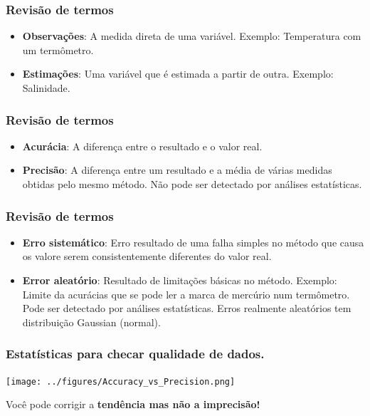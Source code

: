 \begin{frame}
\frametitle{Revisão de termos}
\begin{itemize}
    \item {\bf Observações}: A medida direta de uma variável. Exemplo: Temperatura
          com um termômetro.
    \vspace{1.5cm}\pause
    \item {\bf Estimações}: Uma variável que é estimada a partir de outra.  Exemplo:
          Salinidade.
\end{itemize}
\end{frame}

\begin{frame}
\frametitle{Revisão de termos}
\begin{itemize}
    \item {\bf Acurácia}: A diferença entre o resultado e o valor real.
    \vspace{1.4cm}\pause
    \item {\bf Precisão}: A diferença entre um resultado e a média de várias medidas
          obtidas pelo mesmo método. Não pode ser detectado por análises
          estatísticas.
\end{itemize}
\end{frame}

\begin{frame}
\frametitle{Revisão de termos}
\begin{itemize}
    \item {\bf Erro sistemático}: Erro resultado de uma falha simples no método que
          causa os valore serem consistentemente diferentes do valor real.
    \vspace{0.7cm}\pause
    \item {\bf Error aleatório}: Resultado de limitações básicas no método. Exemplo:
          Limite da acurácias que se pode ler a marca de mercúrio num
          termômetro.  Pode ser detectado por análises estatísticas.
          Erros realmente aleatórios tem distribuição Gaussian (normal).
\end{itemize}
\end{frame}

\begin{frame}
\frametitle{Estatísticas para checar qualidade de dados.}
    \begin{center}
        \texttt{[image: ../figures/Accuracy\_vs\_Precision.png]}
    \end{center}
    \footnotesize{Você pode corrigir a {\bf tendência mas não a imprecisão!}}
\end{frame}

